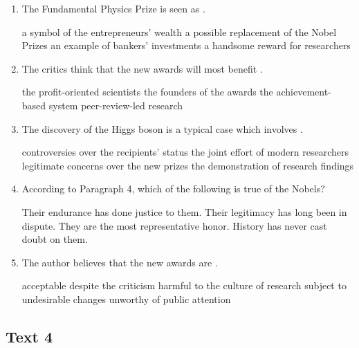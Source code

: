 \begin{enumerate}[resume]
	\item
The Fundamental Physics Prize is seen as \lineread.


\fourchoices
{a symbol of the entrepreneurs' wealth}
{a possible replacement of the Nobel Prizes}
{an example of bankers' investments}
{a handsome reward for researchers}




\item
The critics think that the new awards will most benefit \lineread.


\fourchoices
{the profit-oriented scientists}
{the founders of the awards}
{the achievement-based system}
{peer-review-led research}


\item
The discovery of the Higgs boson is a typical case which
involves \lineread.


\fourchoices
{controversies over the recipients' status}
{the joint effort of modern researchers}
{legitimate concerns over the new prizes}
{the demonstration of research findings}




\item
According to Paragraph 4, which of the following is true of
the Nobels?


\fourchoices
{Their endurance has done justice to them.}
{Their legitimacy has long been in dispute.}
{They are the most representative honor.}
{History has never cast doubt on them.}






\item
The author believes that the new awards are \lineread.


\fourchoices
{acceptable despite the criticism}
{harmful to the culture of research}
{subject to undesirable changes}
{unworthy of public attention}

\end{enumerate}


\newpage
\subsection{Text 4}


